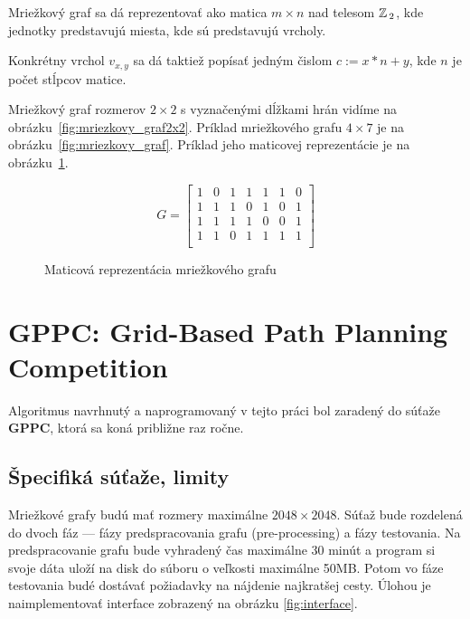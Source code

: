 \begin{note}
	Mriežkový graf sa dá reprezentovať ako matica $m \times n$ nad telesom $\mathbb{Z}\,_2$, kde jednotky predstavujú miesta, kde sú predstavujú vrcholy. 
\end{note}

\begin{note}
\label{note:popis_vrcholu}
	Konkrétny vrchol $v_{x,y}$ sa dá taktiež popísať jedným čislom $c:= x*n + y$, kde $n$ je počet stĺpcov matice.
\end{note}


\begin{example}
Mriežkový graf rozmerov $2 \times 2$ s vyznačenými dĺžkami
hrán vidíme na obrázku~\ref{fig:mriezkovy_graf2x2}.
Príklad mriežkového grafu $4 \times 7$ je na obrázku~\ref{fig:mriezkovy_graf}.
Príklad jeho maticovej reprezentácie je na obrázku~\ref{fig:maticova_reprezentacia}.

\end{example}


\begin{figure}[h]


\[
G =
  \begin{bmatrix}
    1 & 0 & 1 & 1 & 1 & 1 & 0\\
	1 & 1 & 1 & 0 & 1 & 0 & 1\\
	1 & 1 & 1 & 1 & 0 & 0 & 1\\
	1 & 1 & 0 & 1 & 1 & 1 & 1\\
  \end{bmatrix}
\]

\caption{Maticová reprezentácia mriežkového grafu}
\label{fig:maticova_reprezentacia}
\end{figure}




\section{GPPC: Grid-Based Path Planning Competition}
Algoritmus navrhnutý a naprogramovaný v tejto práci bol zaradený do súťaže \textbf{GPPC}, ktorá sa koná približne raz ročne.

\subsection{Špecifiká súťaže, limity}

Mriežkové grafy budú mať rozmery maximálne $2048 \times 2048$.
Súťaž bude rozdelená do dvoch fáz --- fázy predspracovania grafu (pre-processing)
a fázy testovania. Na predspracovanie grafu bude vyhradený čas
maximálne 30 minút a program si svoje dáta uloží na disk do súboru o veľkosti maximálne 50MB.
Potom vo fáze testovania budé dostávať požiadavky na nájdenie najkratšej cesty. Úlohou je naimplementovať interface zobrazený na obrázku \ref{fig:interface}. 

